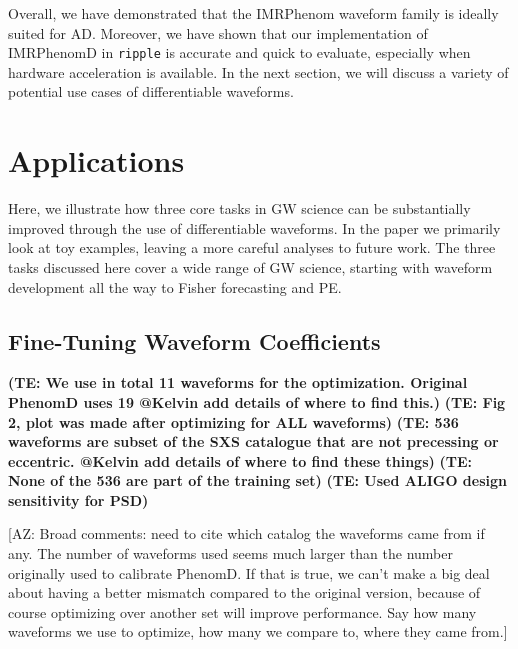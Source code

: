 \documentclass[twocolumn]{aastex631}
\newcommand{\ripple}{\texttt{ripple}\xspace}
\newcommand{\te}[1]{\textbf{\color{pyGreen}(TE: #1)}}
\newcommand{\AZ}[1]{{\color{Burnt}[AZ: #1]}}
\begin{document}
Overall, we have demonstrated that the IMRPhenom waveform family is ideally suited for AD.
Moreover, we have shown that our implementation of IMRPhenomD in \ripple is accurate and quick to evaluate, especially when hardware acceleration is available.
In the next section, we will discuss a variety of potential use cases of differentiable waveforms.


\section{Applications}
\label{sec:applications}

Here, we illustrate how three core tasks in GW science can be substantially improved through the use of differentiable waveforms.
In the paper we primarily look at toy examples, leaving a more careful analyses to future work. 
The three tasks discussed here cover a wide range of GW science, starting with waveform development all the way to Fisher forecasting and PE.

\subsection{Fine-Tuning Waveform Coefficients}
\label{subsec:coeffs}

\te{We use in total 11 waveforms for the optimization. Original PhenomD uses 19 @Kelvin add details of where to find this.}
\te{Fig 2, plot was made after optimizing for ALL waveforms}
\te{536 waveforms are subset of the SXS catalogue that are not precessing or eccentric. @Kelvin add details of where to find these things}
\te{None of the 536 are part of the training set}
\te{Used ALIGO design sensitivity for PSD}

\AZ{Broad comments: need to cite which catalog the waveforms came from if any.
The number of waveforms used seems much larger than the number originally used
to calibrate PhenomD. 
If that is true, we can't make a big deal about having a better mismatch compared to
the original version, because of course optimizing over another set will improve 
performance.
Say how many waveforms we use to optimize, how many we compare to, where they came
from.}
\end{document}
